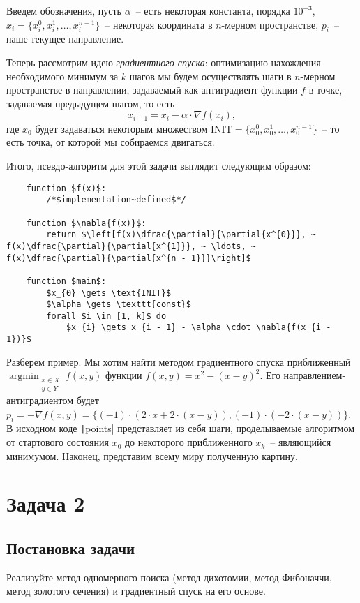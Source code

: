\documentclass[12pt, a4paper, oneside]{article}
\begin{document}
	Введем обозначения, пусть $\alpha$~-- есть некоторая константа, порядка $10^{-3}$, $x_{i} = \{x^{0}_{i}, x^{1}_{i}, \ldots, x^{n - 1}_{i}\}$~-- некоторая координата в $n$-мерном пространстве, $p_{i}$~-- наше текущее направление.

	Теперь рассмотрим идею \textit{градиентного спуска}: оптимизацию нахождения необходимого минимум за $k$ шагов мы будем осуществлять шаги в $n$-мерном пространстве в направлении, задаваемый как антиградиент функции $f$ в точке, задаваемая предыдущем шагом, то есть
	\[
		x_{i + 1} = x_{i} - \alpha \cdot \nabla{f(x_{i})},
	\] где $x_{0}$ будет задаваться некоторым множеством $\text{INIT} = \{x^{0}_{0}, x^{1}_{0}, \ldots, x^{n - 1}_{0}\}$~-- то есть точка, от которой мы собираемся двигаться.

	Итого, псевдо-алгоритм для этой задачи выглядит следующим образом:
	\begin{lstlisting}
	function $f(x)$:
		/*$implementation~defined$*/
	
	function $\nabla{f(x)}$:
		return $\left[f(x)\dfrac{\partial}{\partial{x^{0}}}, ~ f(x)\dfrac{\partial}{\partial{x^{1}}}, ~ \ldots, ~ f(x)\dfrac{\partial}{\partial{x^{n - 1}}}\right]$
	
	function $main$:
		$x_{0} \gets \text{INIT}$
		$\alpha \gets \texttt{const}$
		forall $i \in [1, k]$ do
			$x_{i} \gets x_{i - 1} - \alpha \cdot \nabla{f(x_{i - 1})}$
	\end{lstlisting}
	Разберем пример. Мы хотим найти методом градиентного спуска приближенный $\operatorname*{argmin}_{\substack{x \in X  \\ y \in Y}}{f(x, y)}$ функции $f(x, y) = x^{2} - (x - y)^{2}$. Его направлением-антиградиентом будет $p_{i} = -\nabla{f(x, y)} = \{(-1) \cdot (2 \cdot x + 2 \cdot (x - y)), (-1) \cdot (-2 \cdot (x - y))\}$. 
	В исходном коде \texttt|points| представляет из себя шаги, проделываемые алгоритмом от стартового состояния $x_{0}$ до некоторого приближенного $x_{k}$~-- являющийся минимумом. Наконец, представим всему миру полученную картину.
	\begin{flushleft}
		
	\end{flushleft}
	\section*{Задача 2}
	\subsection*{Постановка задачи}
	Реализуйте метод одномерного поиска (метод дихотомии, метод Фибоначчи, метод золотого сечения) и градиентный спуск на его основе.
\end{document}
